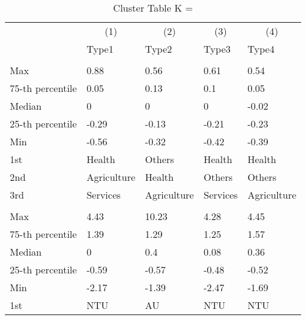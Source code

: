 \begin{table}
\centering
\caption{Cluster Table K = }
\centering
\begin{threeparttable}
\begin{tabular}[t]{lllll}
\toprule
\multicolumn{1}{c}{ } & \multicolumn{1}{c}{(1)} & \multicolumn{1}{c}{(2)} & \multicolumn{1}{c}{(3)} & \multicolumn{1}{c}{(4)} \\
\cmidrule(l{3pt}r{3pt}){2-2} \cmidrule(l{3pt}r{3pt}){3-3} \cmidrule(l{3pt}r{3pt}){4-4} \cmidrule(l{3pt}r{3pt}){5-5}
 & Type1 & Type2 & Type3 & Type4\\
\midrule
\addlinespace[0.3em]
\multicolumn{5}{l}{\textit{\textbf{Panel A: }}}\\
\hspace{1em}Max & 0.88 & 0.56 & 0.61 & 0.54\\
\hspace{1em}75-th percentile & 0.05 & 0.13 & 0.1 & 0.05\\
\hspace{1em}Median & 0 & 0 & 0 & -0.02\\
\hspace{1em}25-th percentile & -0.29 & -0.13 & -0.21 & -0.23\\
\hspace{1em}Min & -0.56 & -0.32 & -0.42 & -0.39\\
\hspace{1em}1st & Health & Others & Health & Health\\
\hspace{1em}2nd & Agriculture & Health & Others & Others\\
\hspace{1em}3rd & Services & Agriculture & Services & Agriculture\\
\addlinespace[0.3em]
\multicolumn{5}{l}{\textit{\textbf{Panel B: }}}\\
\hspace{1em}Max & 4.43 & 10.23 & 4.28 & 4.45\\
\hspace{1em}75-th percentile & 1.39 & 1.29 & 1.25 & 1.57\\
\hspace{1em}Median & 0 & 0.4 & 0.08 & 0.36\\
\hspace{1em}25-th percentile & -0.59 & -0.57 & -0.48 & -0.52\\
\hspace{1em}Min & -2.17 & -1.39 & -2.47 & -1.69\\
\hspace{1em}1st & NTU & AU & NTU & NTU\\

\end{tabular}
\end{threeparttable}
\end{table}
